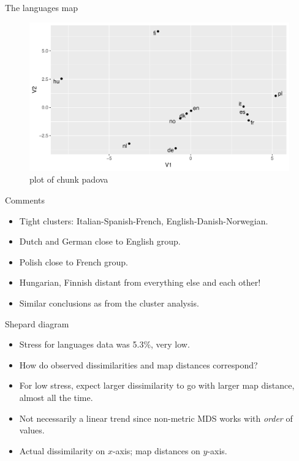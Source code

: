 \documentclass[ignorenonframetext,]{beamer}
\begin{document}
\begin{frame}{The languages map}
\protect\hypertarget{the-languages-map}{}

\begin{figure}
\centering
\includegraphics{figure/padova-1.pdf}
\caption{plot of chunk padova}
\end{figure}

\end{frame}

\begin{frame}{Comments}
\protect\hypertarget{comments-25}{}

\begin{itemize}
\item
  Tight clusters: Italian-Spanish-French, English-Danish-Norwegian.
\item
  Dutch and German close to English group.
\item
  Polish close to French group.
\item
  Hungarian, Finnish distant from everything else and each other!
\item
  Similar conclusions as from the cluster analysis.
\end{itemize}

\end{frame}

\begin{frame}{Shepard diagram}
\protect\hypertarget{shepard-diagram}{}

\begin{itemize}
\item
  Stress for languages data was 5.3\%, very low.
\item
  How do observed dissimilarities and map distances correspond?
\item
  For low stress, expect larger dissimilarity to go with larger map
  distance, almost all the time.
\item
  Not necessarily a linear trend since non-metric MDS works with
  \emph{order} of values.
\item
  Actual dissimilarity on \(x\)-axis; map distances on \(y\)-axis.
\end{itemize}

\end{frame}
\end{document}
